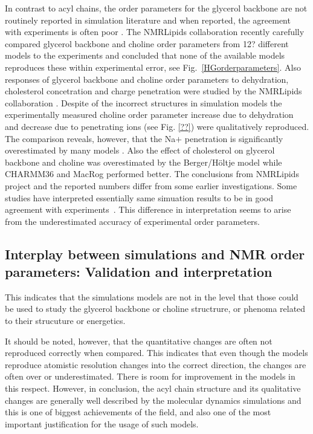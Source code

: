 \documentclass[aps,prl,superscriptaddress,twocolumn]{revtex4}
\begin{document}
In contrast to acyl chains, the order parameters for the glycerol backbone are not routinely
reported in simulation literature and when reported, the agreement with experiments is often poor \cite{??}.
The NMRLipids collaboration recently carefully compared glycerol backbone and choline order parameters  
from 12? different models to the experiments and concluded that none of the available models
reproduces these within experimental error, see Fig.~\ref{HGorderparameters}.
Also responses of glycerol backbone and choline order parameters to 
dehydration, cholesterol concetration and charge penetration were 
studied by the NMRLipids collaboration \cite{botan15,ionpaper}.
Despite of the incorrect structures in simulation models the experimentally measured choline order
parameter increase due to dehydration \cite{botan15} and decrease due to penetrating 
ions \cite{ionpaper} (see Fig. \ref{??}) were qualitatively reproduced. 
The comparison reveals, however, that the Na$ +$ penetration is significantly
overestimated by many models \cite{ionpaper}. 
Also the effect of cholesterol on glycerol backbone and choline was overestimated
by the Berger/Höltje model while CHARMM36 and MacRog performed better. 
The conclusions from NMRLipids project and the reported 
numbers differ from some earlier investigations. Some studies have interpreted
essentially same simuation results to be in good agreement with experiments~\cite{??}.
This difference in interpretation seems to arise from the underestimated accuracy
of experimental order parameters.



\subsection{Interplay between simulations and NMR order parameters: Validation and interpretation}

This indicates that the simulations models are not in the level that those could be used to
study the glycerol backbone or choline structrure, or phenoma related to their strucuture or
energetics.

It should be noted, however, that the quantitative changes
are often not reproduced correctly when compared. This indicates that even though
the models reproduce atomistic resolution changes into the correct direction, 
the changes are often over or underestimated. There is room for improvement
in the models in this respect. However, in conclusion, the acyl chain 
structure and its qualitative changes are generally well described by the
molecular dynamics simulations and this is one of biggest achievements of the
field, and also one of the most important justification for the usage of such models.
\end{document}
